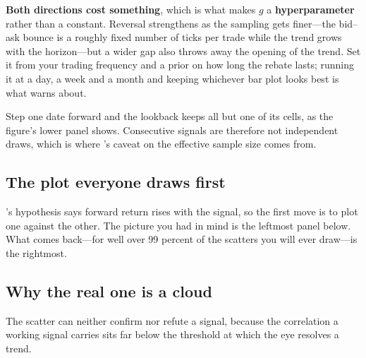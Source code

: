 \textbf{Both directions cost something}, which is what makes $g$ a \textbf{hyperparameter} rather
than a constant. Reversal strengthens as the sampling gets finer---the bid--ask bounce is a roughly
fixed number of ticks per trade while the trend grows with the horizon---but a wider gap also throws
away the opening of the trend. Set it from your trading frequency and a prior on how long the rebate
lasts; running it at a day, a week and a month and keeping whichever bar plot looks best is what
 warns about.

\begin{note}
Step one date forward and the lookback keeps all but one of its cells, as the figure's lower panel
shows. Consecutive signals are therefore not independent draws, which is where
's caveat on the effective sample size comes from.
\end{note}

\subsection{The plot everyone draws first}\label{sec:first-plot}

's hypothesis says forward return rises with the signal, so the first
move is to plot one against the other. The picture you had in mind is the leftmost panel below. What
comes back---for well over 99 percent of the scatters you will ever draw---is the rightmost.


\subsection{Why the real one is a cloud}\label{sec:why-cloud}

\begin{claim}\label{clm:scatter-useless}
The scatter can neither confirm nor refute a signal, because the correlation a working signal
carries sits far below the threshold at which the eye resolves a trend.
\end{claim}

